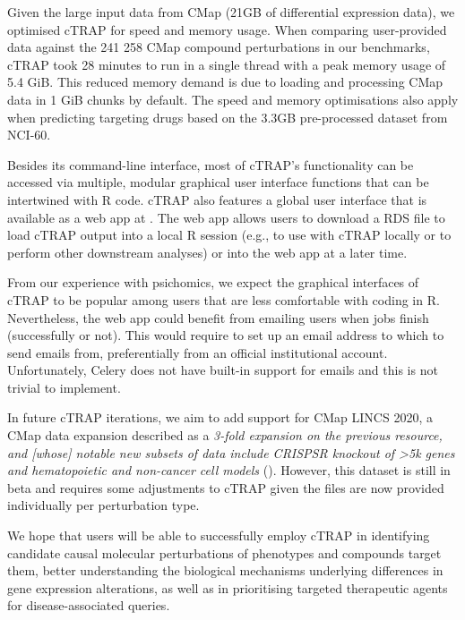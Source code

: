 Given the large input data from CMap (21GB of differential expression data), we optimised cTRAP for speed and memory usage. When comparing user-provided data against the 241 258 CMap compound perturbations in our benchmarks, cTRAP took 28 minutes to run in a single thread with a peak memory usage of 5.4 GiB. This reduced memory demand is due to loading and processing CMap data in 1 GiB chunks by default. The speed and memory optimisations also apply when predicting targeting drugs based on the 3.3GB pre-processed dataset from NCI-60.

Besides its command-line interface, most of cTRAP's functionality can be accessed via multiple, modular graphical user interface functions that can be intertwined with R code. cTRAP also features a global user interface that is available as a web app at . The web app allows users to download a RDS file to load cTRAP output into a local R session (e.g., to use with cTRAP locally or to perform other downstream analyses) or into the web app at a later time.

From our experience with psichomics, we expect the graphical interfaces of cTRAP to be popular among users that are less comfortable with coding in R. Nevertheless, the web app could benefit from emailing users when jobs finish (successfully or not). This would require to set up an email address to which to send emails from, preferentially from an official institutional account. Unfortunately, Celery does not have built-in support for emails and this is not trivial to implement.

In future cTRAP iterations, we aim to add support for CMap LINCS 2020, a CMap data expansion described as a \emph{3-fold expansion on the previous resource, and [whose] notable new subsets of data include CRISPSR knockout of \textgreater 5k genes and hematopoietic and non-cancer cell models} (). However, this dataset is still in beta and requires some adjustments to cTRAP given the files are now provided individually per perturbation type.

We hope that users will be able to successfully employ cTRAP in identifying candidate causal molecular perturbations of phenotypes and compounds target them, better understanding the biological mechanisms underlying differences in gene expression alterations, as well as in prioritising targeted therapeutic agents for disease-associated queries.
